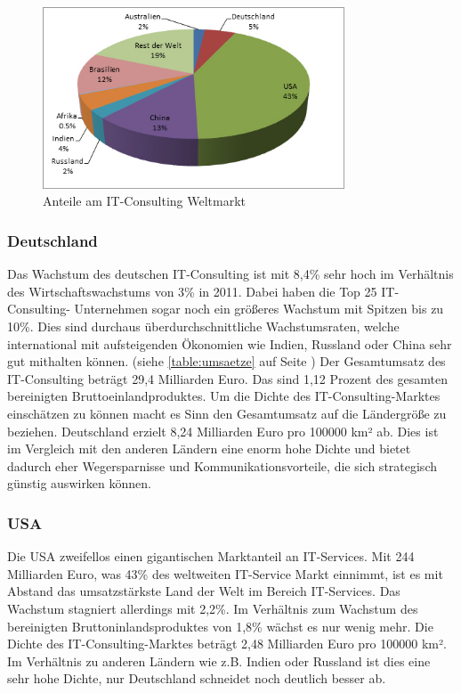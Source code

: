 \begin{figure}
  \centering
  \includegraphics[width=0.8\textwidth]{images/global_revenue_share.jpg} 
  \caption{Anteile am IT-Consulting Weltmarkt} \label{fig:weltmarkt} 
\end{figure}

\subsubsection* {Deutschland}

Das Wachstum des deutschen IT-Consulting ist mit 8,4\% sehr hoch im Verhältnis des Wirtschaftswachstums von 3\% in 2011.\cite{statGer2} Dabei haben die Top 25 IT-Consulting- Unternehmen sogar noch ein größeres Wachstum mit Spitzen bis zu 10\%. \cite[6]{topITB} Dies sind durchaus überdurchschnittliche Wachstumsraten, welche international mit aufsteigenden Ökonomien wie Indien, Russland oder China sehr gut mithalten können.  (siehe  \ref{table:umsaetze}  auf Seite \pageref{table:umsaetze}) Der Gesamtumsatz des IT-Consulting beträgt 29,4 Milliarden Euro.  Das sind 1,12 Prozent des gesamten bereinigten Bruttoeinlandproduktes. \cite{statGer} Um die Dichte des IT-Consulting-Marktes einschätzen zu können macht es Sinn den Gesamtumsatz auf die Ländergröße zu beziehen. 
Deutschland erzielt 8,24 Milliarden Euro pro 100000 km² ab. Dies ist im Vergleich mit den anderen Ländern eine enorm hohe Dichte und bietet dadurch eher Wegersparnisse und Kommunikationsvorteile, die sich strategisch günstig auswirken können. 

\subsubsection* {USA}

Die USA zweifellos einen gigantischen Marktanteil an IT-Services. Mit 244 Milliarden Euro, was 43\% des weltweiten IT-Service Markt einnimmt, ist es mit Abstand das umsatzstärkste Land der Welt im Bereich IT-Services. \cite{ibisUSA} Das Wachstum stagniert allerdings mit 2,2\%. Im Verhältnis zum Wachstum des bereinigten Bruttoninlandsproduktes von 1,8\% wächst es nur wenig mehr. \cite{statUSA} Die Dichte des IT-Consulting-Marktes beträgt 2,48 Milliarden Euro pro 100000 km². Im Verhältnis zu anderen Ländern wie z.B. Indien oder Russland ist dies eine sehr hohe Dichte, nur Deutschland schneidet noch deutlich besser ab.

